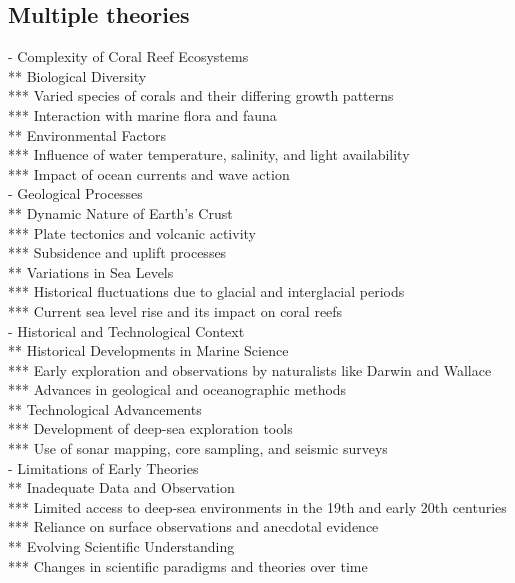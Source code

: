 \subsection{Multiple theories}
- Complexity of Coral Reef Ecosystems \\
** Biological Diversity \\
*** Varied species of corals and their differing growth patterns \\
*** Interaction with marine flora and fauna \\
** Environmental Factors \\
*** Influence of water temperature, salinity, and light availability \\
*** Impact of ocean currents and wave action \\
- Geological Processes \\
** Dynamic Nature of Earth's Crust \\
*** Plate tectonics and volcanic activity \\
*** Subsidence and uplift processes \\
** Variations in Sea Levels \\
*** Historical fluctuations due to glacial and interglacial periods \\
*** Current sea level rise and its impact on coral reefs \\
- Historical and Technological Context \\
** Historical Developments in Marine Science \\
*** Early exploration and observations by naturalists like Darwin and Wallace \\
*** Advances in geological and oceanographic methods \\
** Technological Advancements \\
*** Development of deep-sea exploration tools \\
*** Use of sonar mapping, core sampling, and seismic surveys \\
- Limitations of Early Theories \\
** Inadequate Data and Observation \\
*** Limited access to deep-sea environments in the 19th and early 20th centuries \\
*** Reliance on surface observations and anecdotal evidence \\
** Evolving Scientific Understanding \\
*** Changes in scientific paradigms and theories over time \\
